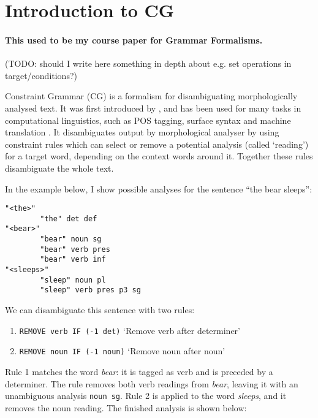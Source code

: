 \section{Introduction to CG}
 
\paragraph{This used to be my course paper for Grammar Formalisms.}

(TODO: should I write here something in depth about e.g. set operations in target/conditions?)

Constraint Grammar (CG) is a formalism for 
disambiguating morphologically analysed text. 
It was first introduced by
\cite{karlsson1995constraint}, and has been used for many tasks in
computational linguistics, such as POS tagging, surface syntax and
machine translation \cite{bick2011}. It disambiguates output by
morphological analyser by using
constraint rules which can select or remove a potential analysis
(called `reading') for a
target word, depending on the context words around it. Together these rules disambiguate the whole text.

In the example below, I show possible analyses for the sentence ``the bear
sleeps'':

\begin{center}
\begin{verbatim}
"<the>"
        "the" det def
"<bear>"
        "bear" noun sg
        "bear" verb pres
        "bear" verb inf
"<sleeps>"
        "sleep" noun pl
        "sleep" verb pres p3 sg
\end{verbatim}
\end{center}

\noindent We can disambiguate this sentence with two rules:

\begin{enumerate}
\def\labelenumi{\arabic{enumi}.}
\itemsep1pt\parskip0pt
\item \texttt{REMOVE verb IF (-1 det)}
  `Remove verb after determiner'
\item  \texttt{REMOVE noun IF (-1 noun)}
  `Remove noun after noun'
\end{enumerate}

\noindent Rule 1 matches the word \emph{bear}: it is tagged as verb and is
preceded by a determiner. The rule removes both verb readings from
\emph{bear}, leaving it with an unambiguous analysis \texttt{noun sg}.
Rule 2 is applied to the word \emph{sleeps}, and it removes the noun
reading. The finished analysis is shown below:


